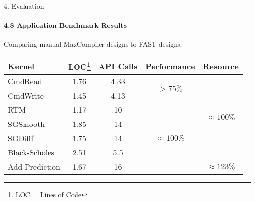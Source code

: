 \begin{frame}{4. Evaluation}
  \framesubtitle{4.8 Application Benchmark Results}
  Comparing manual MaxCompiler designs to FAST designs:
  {\footnotesize
    \begin{table}
      \renewcommand{\arraystretch}{1.5}
      \begin{tabular}{l|c|c|c|c}
        \textbf{Kernel} & \textbf{LOC\footnote{LOC = Lines of Code}} & \textbf{API Calls} & \textbf{Performance}              & \textbf{Resource}
        \\
        \hline\hline
        CmdRead         & 1.76               & 4.33                     & \multirow{2}{1.5cm}{$ > 75\%$}        & \multirow{6}{1.5cm}{$\approx 100\%$} \\
        CmdWrite        & 1.45               & 4.13                     &                                   &                              \\
        \cline{1-4}
        RTM             & 1.17               & 10                       & \multirow{5}{1.5cm}{$ \approx 100\%$} &                              \\
        SGSmooth        & 1.85               & 14                       &                                   &                              \\
        SGDifff         & 1.75               & 14                       &                                   &                              \\
        Black-Scholes   & 2.51               & 5.5                      &                                   &                              \\
        \cline{5-5}
        Add Prediction  & 1.67               & 16                       &                                   &    $ \approx 123 \% $                          \\
      \end{tabular}
    \end{table}}

\end{frame}